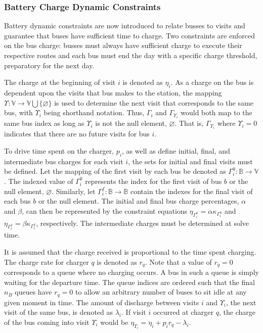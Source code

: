 \documentclass[11pt,a4paper,final]{article}
\begin{document}
\subsubsection{Battery Charge Dynamic Constraints}
\label{sec:batt_dynamics}
Battery dynamic constraints are now introduced to relate busses to visits and guarantee that buses have sufficient time
to charge. Two constraints are enforced on the bus charge: busses must always have sufficient charge to execute their
respective routes and each bus must end the day with a specific charge threshold, preparatory for the next day.

The charge at the beginning of visit \(i\) is denoted as \(\eta_i\). As a charge on the bus is dependent upon the visits that
bus makes to the station, the mapping \(\Upsilon: \mathbb{V} \rightarrow \mathbb{V} \bigcup \{\varnothing\}\) is used to determine the next visit
that corresponds to the same bus, with \(\Upsilon_i\) being shorthand notation. Thus, \(\Gamma_i\) and \(\Gamma_{\Upsilon_i}\) would both map to the
same bus index as long as \(\Upsilon_i\) is not the null element, \(\varnothing\). That is, \(\Gamma_{\Upsilon_i}\) where \(\Upsilon_i = 0\) indicates
that there are no future visits for bus \(i\).

To drive time spent on the charger, \(p_i\), as well as define initial, final, and intermediate bus charges for each visit
\(i\), the sets for initial and final visits must be defined. Let the mapping of the first visit by each bus be denoted as
\(\Gamma^0_i : \mathbb{B} \rightarrow \mathbb{V}\). The indexed value of \(\Gamma^0_i\) represents the index for the first visit of bus \(b\) or
the null element, \(\varnothing\). Similarly, let \(\Gamma^f_i : \mathbb{B} \rightarrow \mathbb{B}\) contain the indexes for the final
visit of each bus \(b\) or the null element. The initial and final bus charge percentages, \(\alpha\) and \(\beta\), can then be
represented by the constraint equations \(\eta_{\Gamma^0_i} = \alpha \kappa_{\Gamma^0_i}\) and \(\eta_{\Gamma^f_i} = \beta \kappa_{\Gamma^f_i}\), respectively. The
intermediate charges must be determined at solve time.

It is assumed that the charge received is proportional to the time spent charging. The charge rate for charger \(q\) is
denoted as \(r_q\). Note that a value of \(r_q = 0\) corresponds to a queue where no charging occurs. A bus in such a queue
is simply waiting for the departure time. The queue indices are ordered such that the final \(n_B\) queues have \(r_q = 0\)
to allow an arbitrary number of buses to sit idle at any given moment in time. The amount of discharge between visits
\(i\) and \(\Upsilon_i\), the next visit of the same bus, is denoted as \(\lambda_i\). If visit \(i\) occurred at charger \(q\), the charge of
the bus coming into visit \(\Upsilon_i\) would be \(\eta_{\Upsilon_i} = \eta_i + p_i r_q - \lambda_i\).
\end{document}
